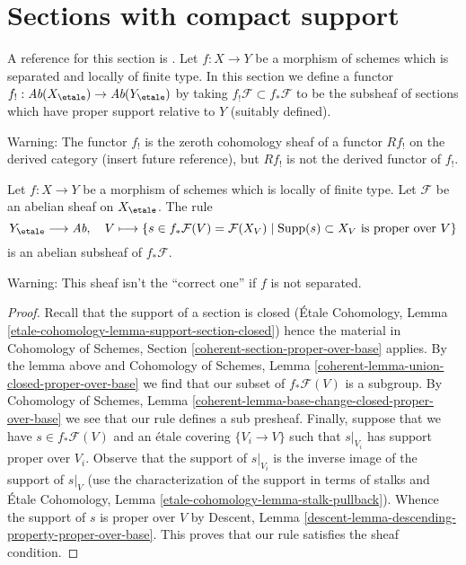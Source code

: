 \section{Sections with compact support}
\label{section-compact-support}

\noindent
A reference for this section is \cite[Exposee XVII, Section 6]{SGA4}.
Let $f : X \to Y$ be a morphism of schemes which is separated and
locally of finite type. In this section we define a functor
$f_! : \textit{Ab}(X_\etale) \to \textit{Ab}(Y_\etale)$
by taking $f_!\mathcal{F} \subset f_*\mathcal{F}$
to be the subsheaf of sections which have proper support relative to $Y$
(suitably defined).

\medskip\noindent
Warning: The functor $f_!$ is the zeroth cohomology sheaf of a functor
$Rf_!$ on the derived category (insert future reference), but
$Rf_!$ is not the derived functor of $f_!$.

\begin{lemma}
\label{lemma-f-shriek-separated}
Let $f : X \to Y$ be a morphism of schemes which is locally of finite type.
Let $\mathcal{F}$ be an abelian sheaf on $X_\etale$. The rule
$$
Y_\etale \longrightarrow \textit{Ab},\quad
V \longmapsto \{s \in f_*\mathcal{F}(V) = \mathcal{F}(X_V) \mid
\text{Supp}(s) \subset X_V \text{ is proper over }V\}
$$
is an abelian subsheaf of $f_*\mathcal{F}$.
\end{lemma}

\noindent
Warning: This sheaf isn't the ``correct one'' if $f$ is not separated.

\begin{proof}
Recall that the support of a section is closed
(\'Etale Cohomology, Lemma \ref{etale-cohomology-lemma-support-section-closed})
hence the material in
Cohomology of Schemes, Section \ref{coherent-section-proper-over-base}
applies. By the lemma above and
Cohomology of Schemes, Lemma \ref{coherent-lemma-union-closed-proper-over-base}
we find that our subset of $f_*\mathcal{F}(V)$ is a subgroup.
By Cohomology of Schemes, Lemma
\ref{coherent-lemma-base-change-closed-proper-over-base}
we see that our rule defines a sub presheaf.
Finally, suppose that we have $s \in f_*\mathcal{F}(V)$
and an \'etale covering $\{V_i \to V\}$ such that
$s|_{V_i}$ has support proper over $V_i$.
Observe that the support of $s|_{V_i}$ is the inverse
image of the support of $s|_V$ (use the characterization
of the support in terms of stalks and
\'Etale Cohomology, Lemma \ref{etale-cohomology-lemma-stalk-pullback}).
Whence the support of $s$ is proper over $V$ by
Descent, Lemma \ref{descent-lemma-descending-property-proper-over-base}.
This proves that our rule satisfies the sheaf condition.
\end{proof}

